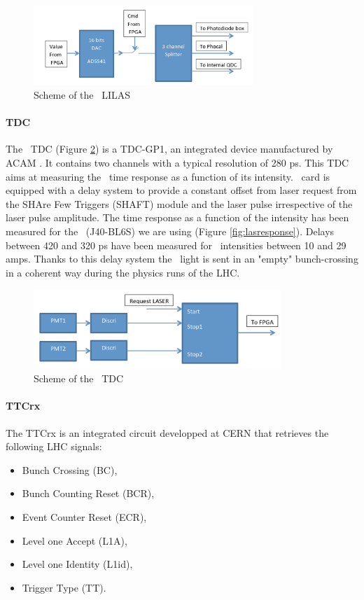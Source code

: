 \begin{figure}[htbp]

\centering
\includegraphics[height=3cm]{figures/lilas.pdf}
\caption{Scheme of the \lascar~LILAS}\label{fig:laslascarlilas}
\end{figure}

\paragraph{TDC}
The \lascar~TDC (Figure \ref{fig:laslascartdc}) is a TDC-GP1, an integrated device manufactured by ACAM \cite{ref:tdc}. It contains two channels with a typical resolution of 280 ps. This TDC aims at measuring the \las~time response as a function of its intensity. \lascar~card is equipped with a delay system to provide a constant offset from laser request from the SHAre Few Triggers (SHAFT) module and the laser pulse irrespective of the laser pulse amplitude. The time response as a function of the intensity has been measured for the \las~(J40-BL6S) we are using (Figure \ref{fig:lasresponse}). Delays between 420 and 320 ps have been measured for \laser~intensities between 10 and 29 amps. Thanks to this delay system the \las~light is sent in an "empty" bunch-crossing in a coherent way during the physics runs of the LHC.

\begin{figure}[htbp]

\centering
\includegraphics[height=3cm]{figures/tdc.pdf}
\caption{Scheme of the \lascar~TDC}\label{fig:laslascartdc}
\end{figure}

\paragraph{TTCrx}

The TTCrx \cite{ref:ttcrx} is an integrated circuit developped at CERN that retrieves the following LHC signals:
\begin{itemize}
\item Bunch Crossing (BC),
\item Bunch Counting Reset (BCR),
\item Event Counter Reset (ECR),
\item Level one Accept (L1A),
\item Level one Identity (L1id),
\item Trigger Type (TT).
\end{itemize}

